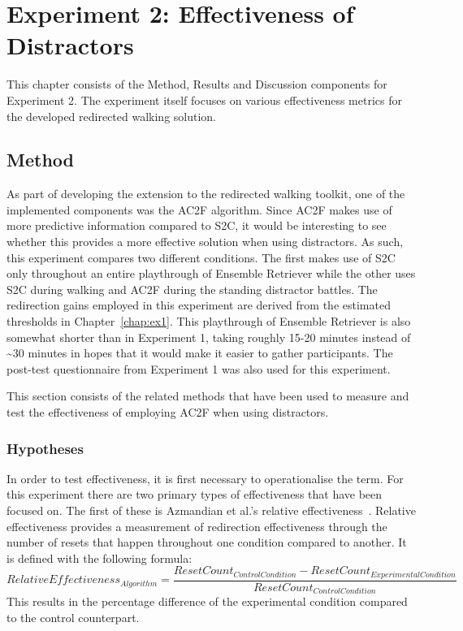 \chapter{Experiment 2: Effectiveness of Distractors}\label{chap:ex2}
This chapter consists of the Method, Results and Discussion components for Experiment 2. The experiment itself focuses on various effectiveness metrics for the developed redirected walking solution. 


\section{Method}
As part of developing the extension to the redirected walking toolkit, one of the implemented components was the AC2F algorithm. Since AC2F makes use of more predictive information compared to S2C, it would be interesting to see whether this provides a more effective solution when using distractors. As such, this experiment compares two different conditions. The first makes use of S2C only throughout an entire playthrough of Ensemble Retriever while the other uses S2C during walking and AC2F during the standing distractor battles. The redirection gains employed in this experiment are derived from the estimated thresholds in Chapter~\ref{chap:ex1}. This playthrough of Ensemble Retriever is also somewhat shorter than in Experiment 1, taking roughly 15-20 minutes instead of \textasciitilde30 minutes in hopes that it would make it easier to gather participants. The post-test questionnaire from Experiment 1 was also used for this experiment. 

This section consists of the related methods that have been used to measure and test the effectiveness of employing AC2F when using distractors. 

\subsection{Hypotheses}
In order to test effectiveness, it is first necessary to operationalise the term. For this experiment there are two primary types of effectiveness that have been focused on. The first of these is Azmandian et al.'s relative effectiveness~\cite{azmandian2015physical}. Relative effectiveness provides a measurement of redirection effectiveness through the number of resets that happen throughout one condition compared to another. It is defined with the following formula:
$$
RelativeEffectiveness_{Algorithm} = \frac{ResetCount_{ControlCondition} - ResetCount_{ExperimentalCondition}}{ResetCount_{ControlCondition}}
$$
This results in the percentage difference of the experimental condition compared to the control counterpart. 

